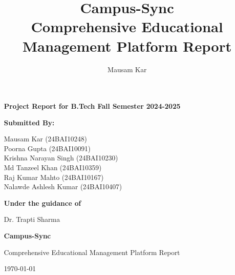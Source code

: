 \documentclass[12pt,a4paper]{report}
\title{\Huge \textbf{Campus-Sync} \\ \Large Comprehensive Educational Management Platform Report}
\author{Mausam Kar}
\begin{document}
\begin{titlepage}
    \centering
    \vspace{2cm}
    
    {\LARGE \textbf{Project Report for B.Tech Fall Semester 2024-2025}}\\
    
    \vspace{3cm}
    
    {\Large \textbf{Submitted By:}}\\
    
    \vspace{0.5cm}
    
    {\large
    Mausam Kar (24BAI10248)\\
    Poorna Gupta (24BAI10091)\\
    Krishna Narayan Singh (24BAI10230)\\
    Md Tanzeel Khan (24BAI10359)\\
    Raj Kumar Mahto (24BAI10167)\\
    Nalawde Ashlesh Kumar (24BAI10407)\\
    }
    
    \vspace{2cm}
    
    {\Large \textbf{Under the guidance of}}\\
    
    \vspace{0.5cm}
    
    {\large
    Dr. Trapti Sharma\\
    }
    
    \vspace{3cm}
    
    {\LARGE \textbf{Campus-Sync}}\\
    
    \vspace{0.5cm}
    
    {\Large Comprehensive Educational Management Platform Report}\\
    
    \vspace{2cm}
    
    {\large \today}
    
\end{titlepage}

\thispagestyle{empty}

\newpage
\tableofcontents
\thispagestyle{empty}

\newpage
\listoffigures
\thispagestyle{empty}
\end{document}
